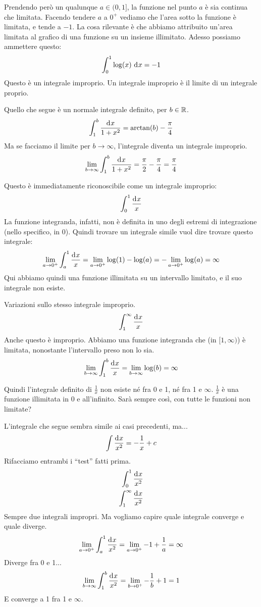 Prendendo per\`o un qualunque $a \in (0,1]$, la funzione nel punto $a$ \`e sia continua che limitata. Facendo tendere $a$ a $0^+$ vediamo che l'area sotto la funzione \`e limitata, e tende a $-1$. La cosa rilevante \`e che abbiamo attribuito un'area limitata al grafico di una funzione su un insieme illimitato. Adesso possiamo ammettere questo:
\[
\int_{0}^{1} \log (x) \dx = -1
\]
Questo \`e un integrale improprio. Un integrale improprio \`e il limite di un integrale proprio.

\begin{exmp}
Quello che segue \`e un normale integrale definito, per $b \in \mathbb{R}$.
\[
\int_{1}^{b} \frac{\diff x}{1 + x^2} = \arctan (b) - \frac{\pi}{4}
\]
Ma se facciamo il limite per $b \to \infty$, l'integrale diventa un integrale improprio.
\[
\lim_{b \to \infty} \int_{1}^{b} \frac{\diff x}{1 + x^2} = \frac{\pi}{2} - \frac{\pi}{4} = \frac{\pi}{4}
\]
\end{exmp}

\begin{exmp}
Questo \`e immediatamente riconoscibile come un integrale improprio:
\[
\int_{0}^{1} \frac{\diff x}{x}
\]
La funzione integranda, infatti, non \`e definita in uno degli estremi di integrazione (nello specifico, in 0). Quindi trovare un integrale simile vuol dire trovare questo integrale:
\[
\lim_{a \to 0^+} \int_{a}^{1} \frac{\diff x}{x} =
\lim_{a \to 0^+} \log(1) - \log(a) = 
- \lim_{a \to 0^+} \log(a) = \infty
\]
Qui abbiamo quindi una funzione illimitata su un intervallo limitato, e il suo integrale non esiste.
\end{exmp}

\begin{exmp}
Variazioni sullo stesso integrale improprio.
\[
\int_{1}^{\infty} \frac{\diff x}{x}
\]
Anche questo \`e improprio. Abbiamo una funzione integranda che (in $[1, \infty)$) \`e limitata, nonostante l'intervallo preso non lo sia.
\[
\lim_{b \to \infty} \int_{1}^{b} \frac{\diff x}{x} = \lim_{b \to \infty} \log(b) = \infty
\]
\end{exmp}

Quindi l'integrale definito di $\frac{1}{x}$ non esiste n\'e fra 0 e 1, n\'e fra 1 e $\infty$. $\frac{1}{x}$ \`e una funzione illimitata in 0 e all'infinito. Sar\`a sempre cos\`i, con tutte le funzioni non limitate?

\begin{exmp}
L'integrale che segue sembra simile ai casi precedenti, ma... 
\[
\int \frac{\diff x}{x^2} = - \frac{1}{x} + c
\]
Rifacciamo entrambi i ``test'' fatti prima.
\begin{align*}
\int_{0}^{1} \frac{\diff x}{x^2} \\
\int_{1}^{\infty} \frac{\diff x}{x^2}
\end{align*}
Sempre due integrali impropri. Ma vogliamo capire quale integrale converge e quale diverge.
\[
\lim_{a \to 0^+} \int_{a}^{1} \frac{\diff x}{x^2} =
\lim_{a \to 0^+} - 1 + \frac{1}{a} = \infty
\]
Diverge fra 0 e 1...
\[
\lim_{b \to \infty} \int_{1}^{b} \frac{\diff x}{x^2} =
\lim_{b \to 0^+} - \frac{1}{b} + 1 = 1
\]
E converge a 1 fra 1 e $\infty$.
\end{exmp}

